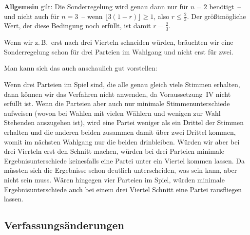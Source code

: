 \textbf{Allgemein} gilt: Die Sonderregelung wird genau dann nur für $n = 2$ benötigt~-- und
nicht auch für $n = 3$~-- wenn $\lfloor 3(1-r) \rfloor \geq 1$, also $r \leq \frac{2}{3}$.
Der größtmögliche Wert, der diese Bedingung noch erfüllt, ist damit $r = \frac{2}{3}$.

Wenn wir z.\,B.\ erst nach drei Vierteln schneiden würden, bräuchten wir eine Sonderregelung
schon für drei Parteien im Wahlgang und nicht erst für zwei.

Man kann sich das auch anschaulich gut vorstellen:

Wenn drei Parteien im Spiel sind, die alle genau gleich viele Stimmen erhalten, dann können wir
das Verfahren nicht anwenden, da Voraussetzung~IV nicht erfüllt ist. Wenn die Parteien aber auch
nur minimale Stimmenunterschiede aufweisen (wovon bei Wahlen mit vielen Wählern und wenigen zur
Wahl Stehenden auszugehen ist), wird eine Partei weniger als ein Drittel der Stimmen erhalten und
die anderen beiden zusammen damit über zwei Drittel kommen, womit im nächsten Wahlgang nur die
beiden drinbleiben. Würden wir aber bei drei Vierteln erst den Schnitt machen, würden bei drei
Parteien minimale Ergebnisunterschiede keinesfalls eine Partei unter ein Viertel kommen lassen.
Da müssten sich die Ergebnisse schon deutlich unterscheiden, was sein kann, aber nicht sein muss.
Wären hingegen vier Parteien im Spiel, würden minimale Ergebnisunterschiede auch bei einem drei
Viertel Schnitt eine Partei rausfliegen lassen.

\subsection{Verfassungsänderungen}

